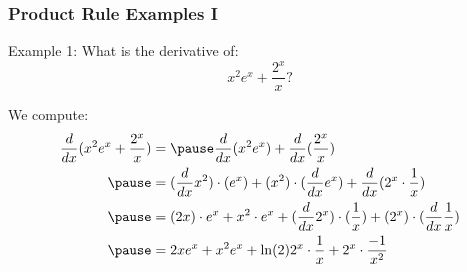\documentclass{ltx-talk}
\begin{document}
\begin{frame}
  \frametitle{Product Rule Examples I}

  Example 1: What is the derivative of:
  \begin{equation}
    x^2 e^x + \dfrac{2^x}{x}?
  \end{equation} \pause

  We compute: \pause
  \begin{align}
    \dfrac{d}{dx}(x^2 e^x + \dfrac{2^x}{x}) &= \pause \dfrac{d}{dx}(x^2 e^x) + \dfrac{d}{dx}(\dfrac{2^x}{x}) \\ \pause
                                            &= (\dfrac{d}{dx} x^2) \cdot (e^x) + (x^2) \cdot (\dfrac{d}{dx} e^x) + \dfrac{d}{dx}(2^x \cdot \dfrac{1}{x}) \\ \pause
                                            &= (2x) \cdot e^x + x^2 \cdot e^x + (\dfrac{d}{dx} 2^x) \cdot (\dfrac{1}{x}) + (2^x) \cdot (\dfrac{d}{dx} \dfrac{1}{x}) \\ \pause
                                            &= 2xe^x + x^2 e^x + \ln(2) 2^x \cdot \dfrac{1}{x} + 2^x \cdot \dfrac{-1}{x^2}
  \end{align}
\end{frame}
\end{document}
